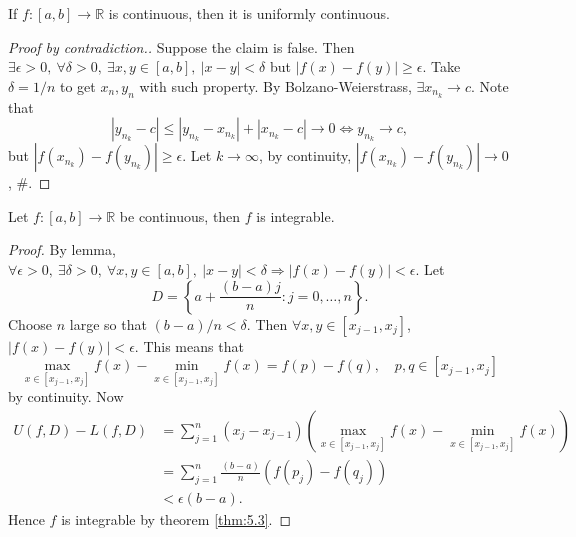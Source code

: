 \begin{lemma}\label{lma:5.5}
    If $ f:[a,b]\to \mathbb{R}  $ is continuous, then it is uniformly continuous.
\end{lemma}
\begin{proof}[Proof by contradiction.]
    Suppose the claim is false. Then $ \exists \epsilon>0,\ \forall \delta>0,\ \exists x,y\in [a,b],\ |x-y|<\delta $ but $ |f(x)-f(y)|\ge \epsilon $. Take $ \delta=1/n $ to get $ x_n,y_n $ with such property. By Bolzano-Weierstrass, $ \exists x_{n_k}\to c $. Note that 
    \[
        |y_{n_k}-c|\le |y_{n_k}-x_{n_k}|+|x_{n_k}-c|\to 0 \Longleftrightarrow y_{n_k}\to c,
    \]
    but $ |f(x_{n_k})-f(y_{n_k})|\ge \epsilon $. Let $ k\to \infty $, by continuity, $ |f(x_{n_k})-f(y_{n_k})|\to 0 $, \#.
\end{proof}

\begin{theorem}\label{thm:5.6}
    Let $f:[a,b]\to \mathbb{R}$ be continuous, then $f$ is integrable. 
\end{theorem}
\begin{proof}
    By lemma, $ \forall \epsilon>0,\ \exists \delta>0,\ \forall x,y\in [a,b],\ |x-y|<\delta \Rightarrow |f(x)-f(y)|<\epsilon $. Let 
    \[
        D=\left\{ a+\frac{(b-a)j}{n}:j=0,\dots,n \right\}.
    \]
    Choose $n$ large so that $ (b-a)/n<\delta $. Then $\forall  x,y\in [x_{j-1},x_j] $, $ |f(x)-f(y)|<\epsilon $. This means that 
    \[
        \max_{x\in [x_{j-1},x_j]}f(x)-\min _{x\in [x_{j-1},x_j]}f(x)=f(p)-f(q),\quad p,q\in[x_{j-1},x_j]
    \]
    by continuity. Now 
    \begin{align*}
        U(f,D)-L(f,D)&= \sum_{j=1}^{n}(x_{j}-x_{j-1})\left( \max_{x\in [x_{j-1},x_j]}f(x)-\min _{x\in [x_{j-1},x_j]}f(x) \right)\\ 
        &= \sum_{j=1}^{n}\frac{(b-a)}{n}(f(p_j)-f(q_j))\\ 
        &<\epsilon(b-a).
    \end{align*}
    Hence $f$ is integrable by theorem \ref{thm:5.3}.
\end{proof}